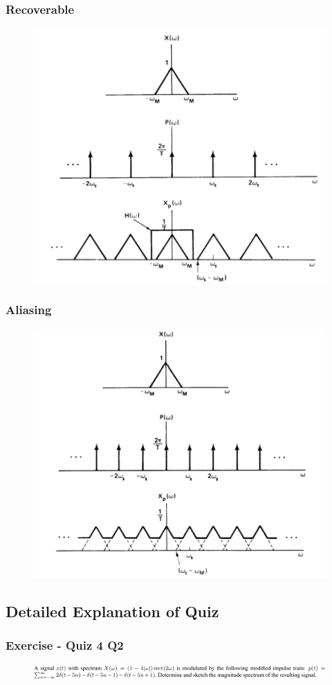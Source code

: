 \documentclass{beamer}
\begin{document}
\begin{frame}
\frametitle{Recoverable}
\begin{figure}
\includegraphics[width=0.7\linewidth]{sample2}
\end{figure}
\end{frame}

\begin{frame}
\frametitle{Aliasing}
\begin{figure}
\includegraphics[width=0.7\linewidth]{sample3}
\end{figure}
\end{frame}

\subsection{Detailed Explanation of Quiz}

\begin{frame}[t]
    \frametitle{Exercise - Quiz 4 Q2}
    \begin{figure}
        \includegraphics[width=1\linewidth]{quiz4_2.PNG}
    \end{figure}
\end{frame}
\end{document}
